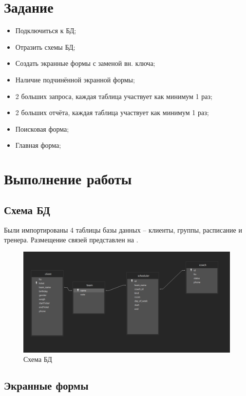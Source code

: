 \documentclass[a4paper,14pt]{article}
\begin{document}

\tableofcontents
\pagebreak

\section{Задание}

\begin{itemize}
	\item Подключиться к БД;
	\item Отразить схемы БД;
	\item Создать экранные формы с заменой вн. ключа;
	\item Наличие подчинённой экранной формы;
	\item 2 больших запроса, каждая таблица участвует как минимум 1 раз;
	\item 2 больших отчёта, каждая таблица участвует как минимум 1 раз;
	\item Поисковая форма;
	\item Главная форма;
\end{itemize}
\section{Выполнение работы}

\subsection{Схема БД}
	Были импортированы 4 таблицы базы данных -- клиенты, группы, расписание и тренера.
	Размещение связей представлен на .
	
	\begin{figure}[H]
		\centering		
		\includegraphics[width=0.8\linewidth]{image/5_schema}
		\caption{Схема БД}\label{img:5_schema}
	\end{figure}

 
 \subsection{Экранные формы}
 
\end{document}
